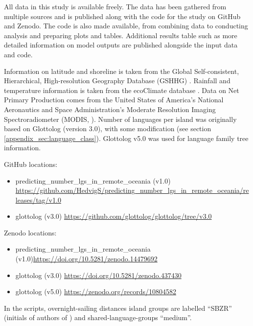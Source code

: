 \documentclass[unnumsec,webpdf,modern,medium]{oup-authoring-template}
\begin{document}
All data in this study is available freely. The data has been gathered from multiple sources and is published along with the code for the study on GitHub and Zenodo. The code is also made available, from combining data to conducting analysis and preparing plots and tables. Additional results table such as more detailed information on model outputs are published alongside the input data and code.

Information on latitude and shoreline is taken from the Global Self-consistent, Hierarchical, High-resolution Geography Database (GSHHG) \citep{wessel1996global}. Rainfall and temperature information is taken from the ecoClimate database \citep{ecoclimate}. Data on Net Primary Production comes from the  United States of America's National Aeronautics and Space Administration's Moderate Resolution Imaging Spectroradiometer (MODIS, \citet{running2021modis_terra, running2021modis_aqua}). Number of languages per island was originally based on Glottolog (version 3.0), with some modification (see section \ref{appendix_sec:language_class}). Glottolog v5.0 \citet{Glottolog5} was used for language family tree information. 

GitHub locations:
\begin{itemize}
\item predicting\_number\_lgs\_in\_remote\_oceania (v1.0) \url{https://github.com/HedvigS/predicting_number_lgs_in_remote_oceania/releases/tag/v1.0}
\item glottolog (v3.0) \url{https://github.com/glottolog/glottolog/tree/v3.0}
\end{itemize}

Zenodo locations:
\begin{itemize}
\item predicting\_number\_lgs\_in\_remote\_oceania   (v1.0)\url{https://doi.org/10.5281/zenodo.14479692}
\item glottolog (v3.0) \url{https://doi.org/10.5281/zenodo.437430}
\item glottolog (v5.0) \url{https://zenodo.org/records/10804582}

\end{itemize}

In the scripts, overnight-sailing distances island groups are labelled ``SBZR'' (initials of authors of \cite{NZSA_overnight_2023}) and shared-language-groups ``medium''.
\newpage
\end{document}
